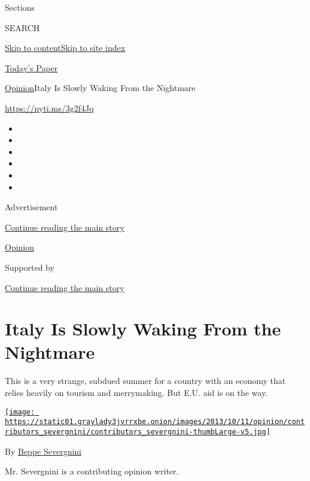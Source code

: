 Sections

SEARCH

\protect\hyperlink{site-content}{Skip to
content}\protect\hyperlink{site-index}{Skip to site index}

\href{https://myaccount.nytimes3xbfgragh.onion/auth/login?response_type=cookie\&client_id=vi}{}

\href{https://www.nytimes3xbfgragh.onion/section/todayspaper}{Today's
Paper}

\href{/section/opinion}{Opinion}\textbar{}Italy Is Slowly Waking From
the Nightmare

\url{https://nyti.ms/3g2f4Jq}

\begin{itemize}
\item
\item
\item
\item
\item
\item
\end{itemize}

Advertisement

\protect\hyperlink{after-top}{Continue reading the main story}

\href{/section/opinion}{Opinion}

Supported by

\protect\hyperlink{after-sponsor}{Continue reading the main story}

\hypertarget{italy-is-slowly-waking-from-the-nightmare}{%
\section{Italy Is Slowly Waking From the
Nightmare}\label{italy-is-slowly-waking-from-the-nightmare}}

This is a very strange, subdued summer for a country with an economy
that relies heavily on tourism and merrymaking. But E.U. aid is on the
way.

\href{https://topics.nytimes3xbfgragh.onion/top/reference/timestopics/people/s/beppe_severgnini/index.html}{\texttt{[image: https://static01.graylady3jvrrxbe.onion/images/2013/10/11/opinion/contributors\_severgnini/contributors\_severgnini-thumbLarge-v5.jpg]}}

By
\href{https://topics.nytimes3xbfgragh.onion/top/reference/timestopics/people/s/beppe_severgnini/index.html}{Beppe
Severgnini}

Mr. Severgnini is a contributing opinion writer.

